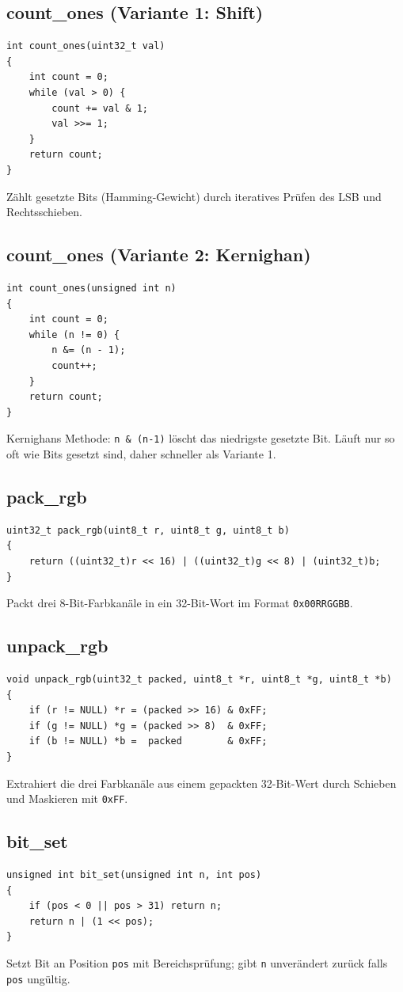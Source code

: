 \documentclass[10pt, a4paper]{article}
\begin{document}
\subsection{count\_ones (Variante 1: Shift)}
\begin{lstlisting}
int count_ones(uint32_t val)
{
    int count = 0;
    while (val > 0) {
        count += val & 1;
        val >>= 1;
    }
    return count;
}
\end{lstlisting}
Z\"ahlt gesetzte Bits (Hamming-Gewicht) durch iteratives Pr\"ufen des LSB und Rechtsschieben.

\subsection{count\_ones (Variante 2: Kernighan)}
\begin{lstlisting}
int count_ones(unsigned int n)
{
    int count = 0;
    while (n != 0) {
        n &= (n - 1);
        count++;
    }
    return count;
}
\end{lstlisting}
Kernighans Methode: \texttt{n \& (n-1)} l\"oscht das niedrigste gesetzte Bit. L\"auft nur so oft wie Bits gesetzt sind, daher schneller als Variante 1.

\subsection{pack\_rgb}
\begin{lstlisting}
uint32_t pack_rgb(uint8_t r, uint8_t g, uint8_t b)
{
    return ((uint32_t)r << 16) | ((uint32_t)g << 8) | (uint32_t)b;
}
\end{lstlisting}
Packt drei 8-Bit-Farbkan\"ale in ein 32-Bit-Wort im Format \texttt{0x00RRGGBB}.

\subsection{unpack\_rgb}
\begin{lstlisting}
void unpack_rgb(uint32_t packed, uint8_t *r, uint8_t *g, uint8_t *b)
{
    if (r != NULL) *r = (packed >> 16) & 0xFF;
    if (g != NULL) *g = (packed >> 8)  & 0xFF;
    if (b != NULL) *b =  packed        & 0xFF;
}
\end{lstlisting}
Extrahiert die drei Farbkan\"ale aus einem gepackten 32-Bit-Wert durch Schieben und Maskieren mit \texttt{0xFF}.

\subsection{bit\_set}
\begin{lstlisting}
unsigned int bit_set(unsigned int n, int pos)
{
    if (pos < 0 || pos > 31) return n;
    return n | (1 << pos);
}
\end{lstlisting}
Setzt Bit an Position \texttt{pos} mit Bereichspr\"ufung; gibt \texttt{n} unver\"andert zur\"uck falls \texttt{pos} ung\"ultig.
\end{document}
